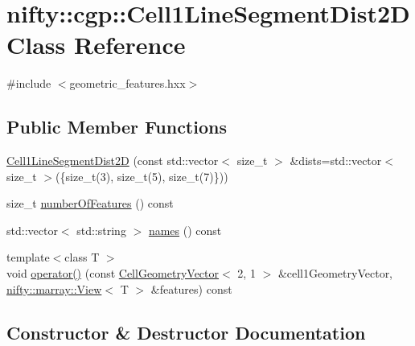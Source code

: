 \hypertarget{classnifty_1_1cgp_1_1Cell1LineSegmentDist2D}{}\section{nifty\+:\+:cgp\+:\+:Cell1\+Line\+Segment\+Dist2D Class Reference}
\label{classnifty_1_1cgp_1_1Cell1LineSegmentDist2D}


{\ttfamily \#include $<$geometric\+\_\+features.\+hxx$>$}

\subsection*{Public Member Functions}
\begin{DoxyCompactItemize}
\item 
\hyperlink{classnifty_1_1cgp_1_1Cell1LineSegmentDist2D_a5d5bf2934bf6be384bff119e69ca275b}{Cell1\+Line\+Segment\+Dist2D} (const std\+::vector$<$ size\+\_\+t $>$ \&dists=std\+::vector$<$ size\+\_\+t $>$(\{size\+\_\+t(3), size\+\_\+t(5), size\+\_\+t(7)\}))
\item 
size\+\_\+t \hyperlink{classnifty_1_1cgp_1_1Cell1LineSegmentDist2D_a8a6c270911d7eef4eed6de8e989f0b98}{number\+Of\+Features} () const
\item 
std\+::vector$<$ std\+::string $>$ \hyperlink{classnifty_1_1cgp_1_1Cell1LineSegmentDist2D_a8eebda085eaee5893d2e046f900ee4a0}{names} () const
\item 
{\footnotesize template$<$class T $>$ }\\void \hyperlink{classnifty_1_1cgp_1_1Cell1LineSegmentDist2D_a1afe73d1ba1b663559ef07ca83996a1a}{operator()} (const \hyperlink{classnifty_1_1cgp_1_1CellGeometryVector}{Cell\+Geometry\+Vector}$<$ 2, 1 $>$ \&cell1\+Geometry\+Vector, \hyperlink{classandres_1_1View}{nifty\+::marray\+::\+View}$<$ T $>$ \&features) const
\end{DoxyCompactItemize}


\subsection{Constructor \& Destructor Documentation}
\mbox{\label{classnifty_1_1cgp_1_1Cell1LineSegmentDist2D_a5d5bf2934bf6be384bff119e69ca275b}} 
